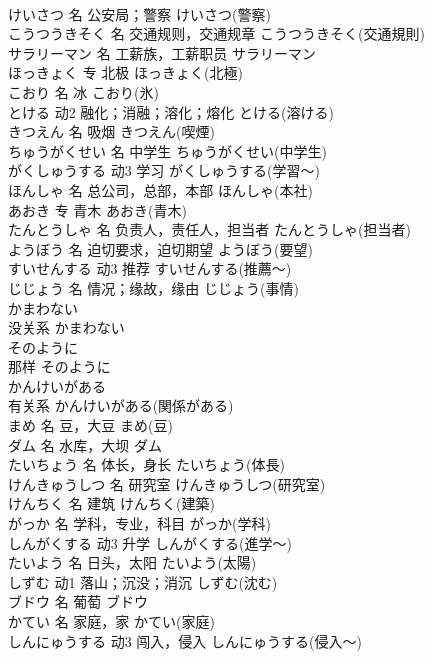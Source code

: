 \documentclass[8pt]{extreport}
\begin{document}
\begin{CJK}{UTF8}{min}
\\	けいさつ	名	公安局；警察	けいさつ(警察)	
\\	こうつうきそく	名	交通规则，交通规章	こうつうきそく(交通規則)	
\\	サラリーマン	名	工薪族，工薪职员	サラリーマン	
\\	ほっきょく	专	北极	ほっきょく(北極)	
\\	こおり	名	冰	こおり(氷)	
\\	とける	动2	融化；消融；溶化；熔化	とける(溶ける)	
\\	きつえん	名	吸烟	きつえん(喫煙)	
\\	ちゅうがくせい	名	中学生	ちゅうがくせい(中学生)	
\\	がくしゅうする	动3	学习	がくしゅうする(学習～)	
\\	ほんしゃ	名	总公司，总部，本部	ほんしゃ(本社)	
\\	あおき	专	青木	あおき(青木)	
\\	たんとうしゃ	名	负责人，责任人，担当者	たんとうしゃ(担当者)	
\\	ようぼう	名	迫切要求，迫切期望	ようぼう(要望)	
\\	すいせんする	动3	推荐	すいせんする(推薦～)	
\\	じじょう	名	情况；缘故，缘由	じじょう(事情)	
\\	かまわない	
\\	没关系	かまわない	
\\	そのように	
\\	那样	そのように	
\\	かんけいがある	
\\	有关系	かんけいがある(関係がある)	
\\	まめ	名	豆，大豆	まめ(豆)	
\\	ダム	名	水库，大坝	ダム	
\\	たいちょう	名	体长，身长	たいちょう(体長)	
\\	けんきゅうしつ	名	研究室	けんきゅうしつ(研究室)	
\\	けんちく	名	建筑	けんちく(建築)	
\\	がっか	名	学科，专业，科目	がっか(学科)	
\\	しんがくする	动3	升学	しんがくする(進学～)	
\\	たいよう	名	日头，太阳	たいよう(太陽)	
\\	しずむ	动1	落山；沉没；消沉	しずむ(沈む)	
\\	ブドウ	名	葡萄	ブドウ	
\\	かてい	名	家庭，家	かてい(家庭)	
\\	しんにゅうする	动3	闯入，侵入	しんにゅうする(侵入～)	

\end{CJK}
\end{document}
